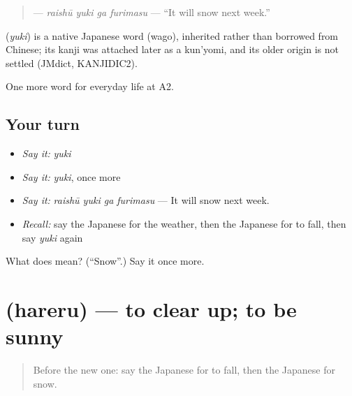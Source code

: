 \begin{quote}
\textbf{  } — \emph{raishū yuki ga furimasu} — \textquotedblleft{}It will snow next week.\textquotedblright{}
\end{quote}

\begin{cousinweb}
\textbf{} (\emph{yuki}) is a native Japanese word (wago), inherited rather than borrowed from Chinese; its kanji was attached later as a kun'yomi, and its older origin is not settled (JMdict, KANJIDIC2).
\end{cousinweb}

\begin{grammarlens}[title={What you've built}]
One more word for everyday life at A2.
\end{grammarlens}

\subsection*{Your turn}
\begin{itemize}
\raggedright
  \item \emph{Say it:} \emph{yuki}
  \item \emph{Say it:} \emph{yuki}, once more
  \item \emph{Say it:} \emph{raishū yuki ga furimasu} — It will snow next week.
  \item \emph{Recall:} say the Japanese for the weather, then the Japanese for to fall, then say \emph{yuki} again
\end{itemize}

\begin{tcolorbox}[breakable,colback=teal!4,colframe=teal!35!black,title={Before you move on}]
What does  mean? (\textquotedblleft{}Snow\textquotedblright{}.) Say it once more.
\end{tcolorbox}
\section[\texorpdfstring{\ja{はれる} (hareru)}{はれる (hareru)}]{ (hareru) — to clear up; to be sunny}

\label{lesson:JA-C207-hareru}



\begin{quote}
Before the new one: say the Japanese for to fall, then the Japanese for snow.
\end{quote}

